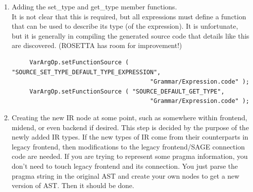 \begin{enumerate}
{{\begin{verbatim}
// ....
SOURCE_VARARG_OPERATOR_START

  SgType*
  $CLASSNAME::get_type() const
   {
     SgType* returnType = p_expression_type;
     ROSE_ASSERT(returnType != NULL);
     return returnType;
   }

  unsigned int $CLASSNAME::cfgIndexForEnd() const {
    return 1;
  }
  //....

SOURCE_VARARG_OPERATOR_END
\end{verbatim} 
 }}
           The C++ source code is extracted 
           from between the named markers (text labels) in the named file and inserted 
           into the generated source code. Using this technique, very small amounts of 
           specialized code can be tailored for each IR node, while still providing an 
           automated means of generating all the rest.  Different locations in the
           generated code can be modified with external code. Here we add the source code
           for a function.

     \item Adding the set\_type and get\_type member functions. \\
           It is not clear that this is required, but all expressions must define a
           function that can be used to describe its type (of the expression).
           It is unfortunate, but it is generally in compiling the generated source code
           that details like this are discovered.  (ROSETTA has room for improvement!)
{\indent
{\mySmallFontSize
\begin{verbatim}
     VarArgOp.setFunctionSource ( "SOURCE_SET_TYPE_DEFAULT_TYPE_EXPRESSION", 
                                       "Grammar/Expression.code" );
     VarArgOp.setFunctionSource ( "SOURCE_DEFAULT_GET_TYPE",
                                       "Grammar/Expression.code" );
\end{verbatim} 
}}

     \item Creating the new IR node at some point, such as somewhere within frontend, midend, or even backend if desired.
           This step is decided by the purpose of the newly added IR types.
           If the new types of IR come from their counterparts in legacy frontend, then modifications to the legacy frontend/SAGE connection code are needed.
           If you are trying to represent some pragma information, you don't need to touch legacy frontend and its connection. 
           You just parse the pragma string in the original AST and create your own nodes to get a new version of AST. 
           Then it should be done.


\end{enumerate}
